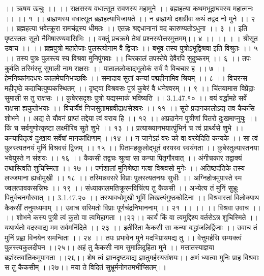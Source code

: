 ।। ऋषय ऊचुः ।। ।।
राक्षसस्य वधात्सूत रावणस्य महामुने ।।
ब्रह्महत्या कथमभूद्राघवस्य महात्मनः ।। ।। १ ।।
ब्राह्मणस्य वधात्सूत ब्रह्महत्याभिजायते ।।
न ब्राह्मणो दशग्रीवः कथं तद्वद नो मुने ।। २ ।।
ब्रह्महत्या भवेत्क्रूरा रामचंद्रस्य धीमतः ।।
एतन्नः श्रद्दधानानां वद कारुण्यतोऽधुना ।। ३ ।।
इति पृष्टस्ततः सूतो नैमिषारण्यवासिभिः ।।
वक्तुं प्रचक्रमे तेषां प्रश्नस्योत्तरमुत्तमम्।। ४ ।। ।। ।
। श्रीसूत उवाच ।। ।।
ब्रह्मपुत्रो महातेजाः पुलस्त्योनाम वै द्विजाः ।।
बभूव तस्य पुत्रोऽभूद्विश्रवा इति विश्रुतः ।। ५ ।।
तस्य पुत्रः पुलस्त्य स्य विश्रवा मुनिपुंगवाः ।।
चिरकालं तपस्तेपे देवैरपि सुदुष्करम् ।। ६ ।।
तपः कुर्वति तस्मिंस्तु सुमाली नाम राक्षसः ।।
पाताललोकाद्भूलोकं सर्वं वै विचचार ह ।। ७ ।।
हेमनिष्कांगदधरः कालमेघनिभच्छविः ।।
समादाय सुतां कन्यां पद्महीनामिव श्रियम् ।। ८ ।।
विचरन्स महीपृष्ठे कदाचित्पुष्पकस्थितम् ।।
दृष्ट्वा विश्रवसः पुत्रं कुबेरं वै धनेश्वरम् ।। ९ ।।
चिंतयामास विप्रेंद्राः सुमाली स तु राक्षसः ।।
कुबेरसदृशः पुत्रो यद्यस्माकं भविष्यति ।। 3.1.47.१० ।।
वयं वर्द्धामहे सर्वे राक्षसा ह्यकुतोभयाः ।।
विचार्यैवं निजसुतामब्रवीद्राक्षसेश्वरः ।। ११ ।।
सुते प्रदानकालोऽद्य तव कैकसि शोभने ।।
अद्य ते यौवनं प्राप्तं तद्देया त्वं वराय हि ।। १२ ।।
अप्रदानेन पुत्रीणां पितरो दुःखमाप्नुयुः ।।
किं च सर्वगुणोत्कृष्टा लक्ष्मीरिव सुते शुभे ।। १३ ।।
प्रत्याख्यानभयात्पुंभिर्न च त्वं प्रार्थ्यसे शुभे ।।
कन्यापितृत्वं दुःखाय सर्वेषां मानकांक्षिणाम् ।।१४ ।।
न जानेऽहं वरः को वा वरयेदिति कन्यके ।।
सा त्वं पुलस्त्यतनयं मुनिं विश्रवसं द्विजम् ।। १५ ।।
पितामहकुलोद्भूतं वरयस्व स्वयंगता ।।
कुबेरतुल्यास्तनया भवेयुस्ते न संशयः ।। १६ ।।
कैकसी तद्वचः श्रुत्वा सा कन्या पितृगौरवात् ।।
अंगीचकार तद्वाक्यं तथास्त्विति शुचिस्मिता ।। १७ ।।
पर्णशालां मुनिश्रेष्ठा गत्वा विश्रवसो मुनेः ।।
अतिष्ठदंतिके तस्य लज्जमाना ह्यधोमुखी ।। १८ ।।
तस्मिन्नवसरे विप्राः पुलस्त्यतनयः सुधीः ।।
अग्निहोत्रमुपास्ते स्म ज्वलत्पावकसन्निभः ।। १९ ।।
संध्याकालमतिक्रूरमविचिंत्य तु कैकसी ।।
अभ्येत्य तं मुनिं सुभ्रूः पितुर्वचनगौरवात् ।। 3.1.47.२० ।।
तस्थावधोमुखी भूमिं लिखत्यंगुष्ठकोटिना ।।
विश्रवास्तां विलोक्याथ कैकसीं तनुमध्यमाम् ।।
उवाच सस्मितो विप्राः पूर्णचंद्रनिभाननाम् ।। २१ ।। ।।
।। विश्रवा उवाच ।। ।।
शोभने कस्य पुत्री त्वं कुतो वा त्वमिहागता ।।२२।।
कार्यं किं वा त्वमुद्दिश्य वर्तसेऽत्र शुचिस्मिते ।।
यथार्थतो वदस्वाद्य मम सर्वमनिंदिते ।। २३ ।।
इतीरिता कैकसी सा कन्या बद्धांजलिर्द्विजाः ।।
उवाच तं मुनिं प्रह्वा विनयेन समन्विता ।। २४ ।।
तपः प्रभावेन मुने मदभिप्रायमद्य तु ।।
वेत्तुमर्हसि सम्यक्त्वं पुलस्त्यकुलदीपन ।।२५।।
अहं तु कैकसी नाम सुमालिदुहिता मुने ।।
मत्तातस्याज्ञया ब्रह्मंस्तवांतिकमुपागता ।।२६।।
शेष त्वं ज्ञानदृष्ट्याद्य ज्ञातुमर्हस्यसंशयः।।
क्षणं ध्यात्वा मुनिः प्राह विश्रवाः स तु कैकसीम् ।।२७।।
मया ते विदितं सुभ्रूर्मनोगतमभीप्सितम्।।
